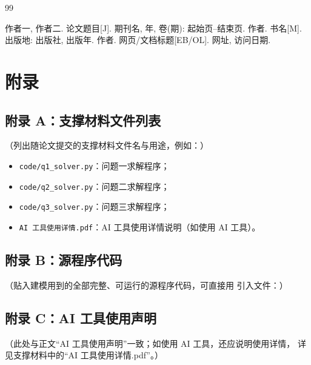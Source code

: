 \documentclass[UTF8,zihao=-4]{ctexart}
\numberwithin{figure}{section}
\numberwithin{table}{section}
\begin{document}
\begin{thebibliography}{99}

   作者一, 作者二. 论文题目[J]. 期刊名, 年, 卷(期): 起始页--结束页.
   作者. 书名[M]. 出版地: 出版社, 出版年.
   作者. 网页/文档标题[EB/OL]. 网址, 访问日期.

\end{thebibliography}

\section*{附录}

\subsection*{附录 A：支撑材料文件列表}
（列出随论文提交的支撑材料文件名与用途，例如：）
\begin{itemize}
  \item \texttt{code/q1\_solver.py}：问题一求解程序；
  \item \texttt{code/q2\_solver.py}：问题二求解程序；
  \item \texttt{code/q3\_solver.py}：问题三求解程序；
  \item \texttt{AI 工具使用详情.pdf}：AI 工具使用详情说明（如使用 AI 工具）。
\end{itemize}

\subsection*{附录 B：源程序代码}
（贴入建模用到的全部完整、可运行的源程序代码，可直接用 \verb|| 引入文件：）
% 


\subsection*{附录 C：AI 工具使用声明}
（此处与正文“AI 工具使用声明”一致；如使用 AI 工具，还应说明使用详情，
详见支撑材料中的“AI 工具使用详情.pdf”。）
\end{document}
